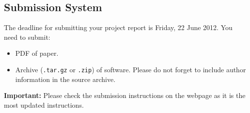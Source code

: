 \subsection{Submission System}

The deadline for submitting your project report is Friday, 22 June
2012.
You need to submit:
\begin{itemize}
\item PDF of paper.
\item Archive (\texttt{.tar.gz} or \texttt{.zip}) of software. Please
  do not forget to include author information in the source archive.
\end{itemize}

\textbf{Important:} Please check the submission instructions on the webpage 
as it is the most updated instructions. 

